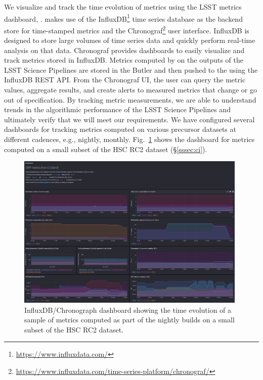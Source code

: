 We visualize and track the time evolution of \faro metrics using the LSST metrics dashboard, \squash\cite{SQR-009}.
\squash makes use of the InfluxDB\footnote{\url{https://www.influxdata.com/}} time series database as the backend store for time-stamped metrics and the Chronograf\footnote{\url{https://www.influxdata.com/time-series-platform/chronograf/}} user interface.
InfluxDB is designed to store large volumes of time series data and quickly perform real-time analysis on that data.
Chronograf provides dashboards to easily visualize and track metrics stored in InfluxDB.
Metrics computed by \faro on the outputs of the LSST Science Pipelines are stored in the Butler and then pushed to the \squash using the InfluxDB REST API.
From the Chronograf UI, the user can query the metric values, aggregate results, and create alerts to measured metrics that change or go out of specification.
By tracking metric measurements, we are able to understand trends in the algorithmic performance of the LSST Science Pipelines and ultimately verify that we will meet our requirements.
We have configured several dashboards for tracking \faro metrics computed on various precursor datasets at different cadences, e.g., nightly, monthly.
Fig.~\ref{fig:squash_metrics_ci} shows the dashboard for \faro metrics computed on a small subset of the HSC RC2 dataset (\S \ref{sssec:ci}). 
\begin{figure}[ht]
  \par\medskip 
  \centering
  \includegraphics[width=0.98\textwidth]{figures/squash-dashboard-ci.png}
  \par\medskip   
  \caption{\label{fig:squash_metrics_ci} 
  InfluxDB/Chronograph dashboard showing the time evolution of a sample of metrics computed as part of the nightly builds on a small subset of the HSC RC2 dataset.}
\end{figure}

